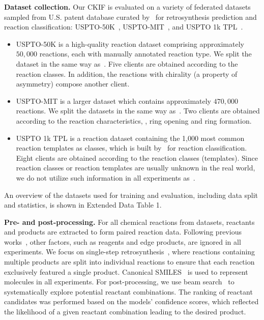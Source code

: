\noindent\textbf{Dataset collection.} 
Our CKIF is evaluated on a variety of federated datasets sampled from U.S. patent database curated by~\citep{lowe2012extraction,Lowe2017} for retrosynthesis prediction and reaction classification: USPTO-50K~\citep{schneider2016s}, USPTO-MIT~\citep{jin2017predicting}, and USPTO 1k TPL~\citep{schwaller2021mapping}.
\begin{itemize}
    \item USPTO-50K is a high-quality reaction dataset comprising approximately $50,000$ reactions, each with manually annotated reaction type. We split the dataset in the same way as~\citep{liu2017retrosynthetic,dai2019retrosynthesis}. Five clients are obtained according to the reaction classes. In addition, the reactions with chirality (a property of asymmetry) compose another client.
    \item USPTO-MIT is a larger dataset which contains approximately $470,000$ reactions. We split the datasets in the same way as~\citep{jin2017predicting}. Two clients are obtained according to the reaction characteristics, \ie, ring opening and ring formation.
    \item USPTO 1k TPL is a reaction dataset containing the 1,000 most common reaction templates as classes, which is built by~\citep{schwaller2021mapping} for reaction classification. Eight clients are obtained according to the reaction classes (templates). Since reaction classes or reaction templates are usually unknown in the real world, we do not utilize such information in all experiments as~\citep{zhong2022root}.
\end{itemize}
\noindent An overview of the datasets used for training and evaluation, including data split and statistics, is shown in Extended Data Table 1.

\noindent\textbf{Pre- and post-processing.} 
For all chemical reactions from datasets, reactants and products are extracted to form paired reaction data. Following previous works~\citep{segler2017neural,dai2019retrosynthesis,wan2022retroformer}, other factors, such as reagents and edge products, are ignored in all experiments. We focus on single-step retrosynthesis~\citep{shi2020graph,yan2020retroxpert,somnath2021learning,wang2021retroprime}, where reactions containing multiple products are split into individual reactions to ensure that each reaction exclusively featured a single product. Canonical SMILES~\citep{weininger1989smiles} is used to represent molecules in all experiments. For post-processing, we use beam search~\citep{freitag2017beam} to systematically explore potential reactant combinations. The ranking of reactant candidates was performed based on the models' confidence scores, which reflected the likelihood of a given reactant combination leading to the desired product.


